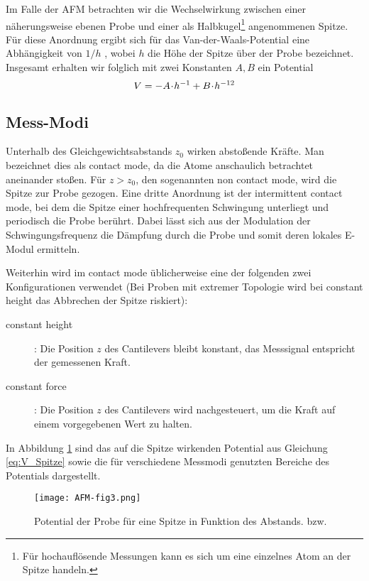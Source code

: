 Im Falle der AFM betrachten wir die Wechselwirkung zwischen einer näherungsweise ebenen Probe und einer als Halbkugel\footnote{Für hochauflösende Messungen kann es sich um eine einzelnes Atom an der Spitze handeln.} angenommenen Spitze. Für diese Anordnung ergibt sich für das Van-der-Waals-Potential eine Abhängigkeit von $1/h$ \cite[S. 5]{lit:hampp}, wobei $h$ die Höhe der Spitze über der Probe bezeichnet. Insgesamt erhalten wir folglich mit zwei Konstanten $A, B$ ein Potential
\begin{equation}
  V =  - A \!\cdot\! h^{-1} + B \!\cdot\! h^{-12} \label{eq:V_Spitze}
\end{equation}

\subsection{Mess-Modi}
Unterhalb des Gleichgewichtsabstands $z_0$ wirken abstoßende Kräfte. Man bezeichnet dies als contact mode, da die Atome anschaulich betrachtet aneinander stoßen. Für $z > z_0$, den sogenannten non contact mode, wird die Spitze zur Probe gezogen. Eine dritte Anordnung ist der intermittent contact mode, bei dem die Spitze einer hochfrequenten Schwingung unterliegt und periodisch die Probe berührt. Dabei lässt sich aus der Modulation der Schwingungsfrequenz die Dämpfung durch die Probe und somit deren lokales E-Modul ermitteln.

Weiterhin wird im contact mode üblicherweise eine der folgenden zwei Konfigurationen verwendet (Bei Proben mit extremer Topologie wird bei constant height das Abbrechen der Spitze riskiert):
\begin{description}
 \item[constant height]: Die Position $z$ des Cantilevers bleibt konstant, das Messsignal entspricht der gemessenen Kraft.
 \item[constant force]: Die Position $z$ des Cantilevers wird nachgesteuert, um die Kraft auf einem vorgegebenen Wert zu halten.
\end{description}

In Abbildung \ref{fig:Potential} sind das auf die Spitze wirkenden Potential aus Gleichung \eqref{eq:V_Spitze} sowie die für verschiedene Messmodi genutzten Bereiche des Potentials dargestellt.

\begin{figure}[h]
	\centering
	\texttt{[image: AFM-fig3.png]}
	\caption{Potential der Probe für eine Spitze in Funktion des Abstands. \cite{lit:grenoble} bzw. \cite{lit:jpk}}
	\label{fig:Potential}
\end{figure}

